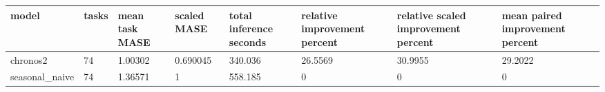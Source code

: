 \begin{tabular}{llllllll}
\toprule
model & tasks & mean task MASE & scaled MASE & total inference seconds & relative improvement percent & relative scaled improvement percent & mean paired improvement percent \\
\midrule
chronos2 & 74 & 1.00302 & 0.690045 & 340.036 & 26.5569 & 30.9955 & 29.2022 \\
seasonal\_naive & 74 & 1.36571 & 1 & 558.185 & 0 & 0 & 0 \\
\bottomrule
\end{tabular}
